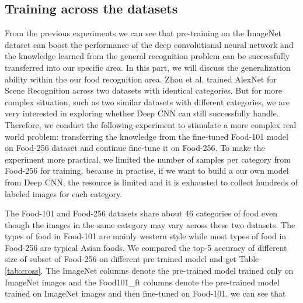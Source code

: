 
\subsection{Training across the datasets}
From the previous experiments we can see that pre-training on the ImageNet dataset can boost the performance of the deep convolutional neural network and the knowledge learned from the general recognition problem can be successfully transferred into our specific area. In this part, we will discuss the generalization ability within the our food recognition area.  Zhou et al. trained AlexNet for Scene Recognition across two datasets with identical categories\cite{NIPS2014_Zhou}. But for more complex situation, such as two similar datasets with different categories, we are very interested in exploring whether Deep CNN can still successfully handle. Therefore, we conduct the following experiment to stimulate a more complex real world problem: transferring the knowledge from the fine-tuned Food-101 model on Food-256 dataset and continue fine-tune it on Food-256. To make the experiment more practical, we limited the number of samples per category from Food-256 for training, because in practise, if we want to build a our own model from Deep CNN, the resource is limited and it is exhausted to collect hundreds of labeled images for each category.

The Food-101 and Food-256 datasets share about 46 categories of food even though the images in the same category may vary across these two datasets. The types of food in Food-101 are mainly western style while most types of food in Food-256 are typical Asian foods. We compared the top-5 accuracy of different size of subset of Food-256 on different pre-trained model and get Table \ref{tab:cross}. The ImageNet columns denote the pre-trained model trained only on ImageNet images and the Food101\_ft columns denote the pre-trained model trained on ImageNet images and then fine-tuned on Food-101. we can see that


